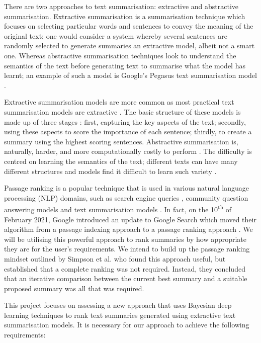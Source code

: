 \documentclass[ %
                    author={James Stephenson},
                supervisor={Dr. Edwin Simpson},
                    degree={MSc},
                     title={PROJECT PLAN},
                  subtitle={Bayesian Deep Learning For Extractive Test Summarisation},
                      type={},
                      year={2022}]{../additions/dissertation}
\begin{document}
		\medbreak
		There are two approaches to text summarisation: extractive and abstractive summarisation. Extractive summarisation is a summarisation technique which focuses on selecting particular words and sentences to convey the meaning of the original text; one would consider a system whereby several sentences are randomly selected to generate summaries an extractive model, albeit not a smart one. Whereas abstractive summarisation techniques look to understand the semantics of the text before generating text to summarise what the model has learnt; an example of such a model is Google's Pegasus text summarisation model \cite{Zhao19}.

		\medbreak
		Extractive summarisation models are more common as most practical text summarisation models are extractive \cite{Gudivada15}. The basic structure of these models is made up of three stages \cite{Nenkova11}: first, capturing the key aspects of the text; secondly, using these aspects to score the importance of each sentence; thirdly, to create a summary using the highest scoring sentences. Abstractive summarisation is, naturally, harder, and more computationally costly to perform \cite{Gudivada15}. The difficulty is centred on learning the semantics of the text; different texts can have many different structures and models find it difficult to learn such variety \cite{Zhu21}.
		
		\medbreak
		Passage ranking is a popular technique that is used in various natural language processing (NLP) domains, such as search engine queries \cite{Chang20}, community question answering models \cite{Lin17} and text summarisation models \cite{Simpson19}. In fact, on the 10\textsuperscript{th} of February 2021, Google introduced an update to Google Search which moved their algorithm from a passage indexing approach to a passage ranking approach \cite{Seround21}. We will be utilising this powerful approach to rank summaries by how appropriate they are for the user's requirements. We intend to build up the passage ranking mindset outlined by Simpson et al. \cite{Simpson19} who found this approach useful, but established that a complete ranking was not required. Instead, they concluded that an iterative comparison between the current best summary and a suitable proposed summary was all that was required.

		\medbreak
		This project focuses on assessing a new approach that uses Bayesian deep learning techniques to rank text summaries generated using extractive text summarisation models. It is necessary for our approach to achieve the following requirements:
\end{document}
